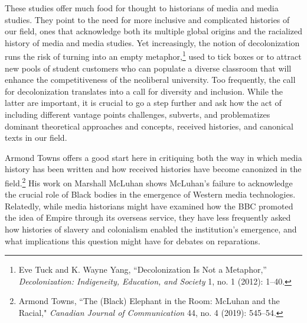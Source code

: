\documentclass{tufte-handout}
\begin{document}
These studies offer much food for thought to historians of media and
media studies. They point to the need for more inclusive and complicated
histories of our field, ones that acknowledge both its multiple global
origins and the racialized history of media and media studies. Yet
increasingly, the notion of decolonization runs the risk of turning into
an empty metaphor,\footnote{Eve Tuck and K. Wayne Yang, ``Decolonization
  Is Not a Metaphor,'' \emph{Decolonization: Indigeneity, Education, and
  Society} 1, no. 1 (2012): 1--40.} used to tick\setcounter{footnote}{12} boxes or to attract new
pools of student customers who can populate a diverse classroom that
will enhance the competitiveness of the neoliberal university. Too
frequently, the call for decolonization translates into a call for
diversity and inclusion. While the latter are important, it is crucial
to go a step further and ask how the act of including different vantage
points challenges, subverts, and problematizes dominant theoretical
approaches and concepts, received histories, and canonical texts in our
field.

Armond Towns offers a good start here in critiquing both the way in
which media history has been written and how received histories have
become canonized in the field.\footnote{Armond Towns, ``The (Black)
  Elephant in the Room: McLuhan and the Racial," \emph{Canadian Journal
  of Communication} 44, no. 4 (2019): 545--54.} His work on Marshall
McLuhan shows McLuhan's failure to acknowledge the crucial role of Black
bodies in the emergence of Western media technologies. Relatedly, while
media historians might have examined how the BBC promoted the idea of
Empire through its overseas service, they have less frequently asked how
histories of slavery and colonialism enabled the institution's
emergence, and what implications this question might have for debates on
reparations.
\end{document}
